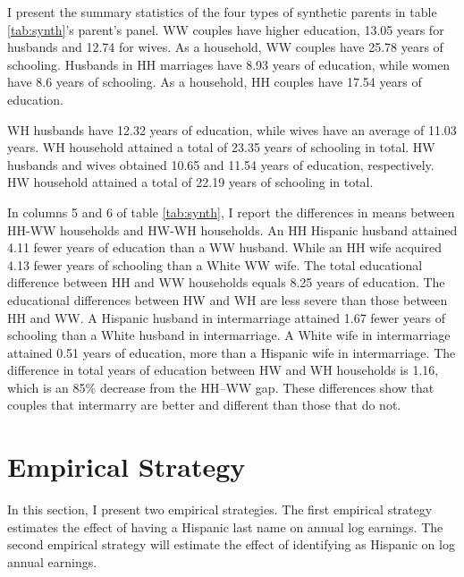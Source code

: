 \documentclass{wptemp}
\begin{document}
I present the summary statistics of the four types of synthetic parents in table \ref{tab:synth}'s parent's panel. WW couples have higher education, 13.05 years for husbands and 12.74 for wives. As a household, WW couples have 25.78 years of schooling. Husbands in HH marriages have 8.93 years of education, while women have 8.6 years of schooling. As a household, HH couples have 17.54 years of education.

WH husbands have 12.32 years of education, while wives have an average of 11.03 years. WH household attained a total of 23.35 years of schooling in total. HW husbands and wives obtained 10.65 and 11.54 years of education, respectively. HW household attained a total of 22.19 years of schooling in total.


In columns 5 and 6 of table \ref{tab:synth}, I report the differences in means between HH-WW households and HW-WH households. An HH Hispanic husband attained 4.11 fewer years of education than a WW husband. While an HH wife acquired 4.13 fewer years of schooling than a White WW wife. The total educational difference between HH and WW households equals 8.25 years of education. The educational differences between HW and WH are less severe than those between HH and WW. A Hispanic husband in intermarriage attained 1.67 fewer years of schooling than a White husband in intermarriage. A White wife in intermarriage attained 0.51 years of education, more than a Hispanic wife in intermarriage. The difference in total years of education between HW and WH households is 1.16, which is an 85\% decrease from the HH--WW gap. These differences show that couples that intermarry are better and different than those that do not.



\section{Empirical Strategy}\label{sec:emp_model}

In this section, I present two empirical strategies. The first empirical strategy estimates the effect of having a Hispanic last name on annual log earnings. The second empirical strategy will estimate the effect of identifying as Hispanic on log annual earnings.
\end{document}
